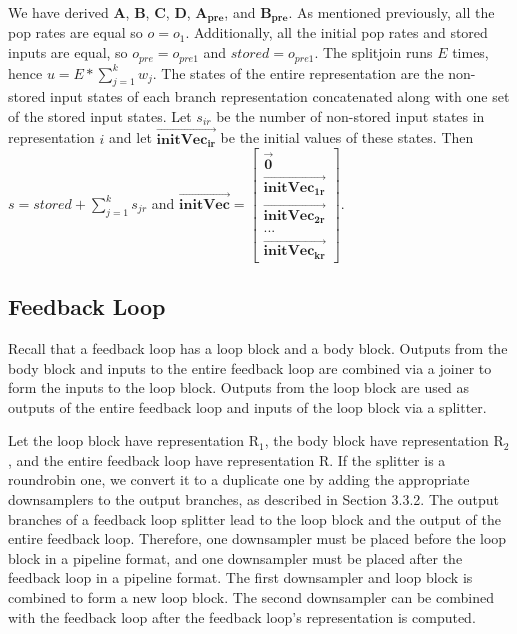     We have derived $\mathbf{A}$, $\mathbf{B}$, $\mathbf{C}$,
$\mathbf{D}$, $\mathbf{A_{pre}}$, and $\mathbf{B_{pre}}$. As
mentioned previously, all the pop rates are equal so $o = o_1$.
Additionally, all the initial pop rates and stored inputs are
equal, so $o_{pre} = o_{pre1}$ and $stored = o_{pre1}$. The
splitjoin runs $E$ times, hence $u = E * \sum_{j=1}^{k} w_j$. The
states of the entire representation are the non-stored input
states of each branch representation concatenated along with one
set of the stored input states. Let $s_{ir}$ be the number of
non-stored input states in representation $i$ and let
$\overrightarrow{\mathbf{initVec_{ir}}}$ be the initial values of
these states. Then $s = stored + \sum_{j=1}^{k} s_{jr}$ and
$\overrightarrow{\mathbf{initVec}} =
\left [ \begin{array} {c} \vec{\mathbf{0}} \\ \overrightarrow{\mathbf{initVec_{1r}}} \\
\overrightarrow{\mathbf{initVec_{2r}}} \\ ... \\
\overrightarrow{\mathbf{initVec_{kr}}} \end{array} \right ]$.

\subsection{Feedback Loop}

    Recall that a feedback loop has a loop block and a body block.
Outputs from the body block and inputs to the entire feedback loop
are combined via a joiner to form the inputs to the loop block.
Outputs from the loop block are used as outputs of the entire
feedback loop and inputs of the loop block via a splitter.

    Let the loop block have representation $\mathrm{R_1}$, the body
block have representation $\mathrm{R_2}$, and the entire feedback
loop have representation $\mathrm{R}$. If the splitter is a
roundrobin one, we convert it to a duplicate one by adding the
appropriate downsamplers to the output branches, as described in
Section 3.3.2. The output branches of a feedback loop splitter
lead to the loop block and the output of the entire feedback loop.
Therefore, one downsampler must be placed before the loop block in
a pipeline format, and one downsampler must be placed after the
feedback loop in a pipeline format. The first downsampler and loop
block is combined to form a new loop block. The second downsampler
can be combined with the feedback loop after the feedback loop's
representation is computed.

